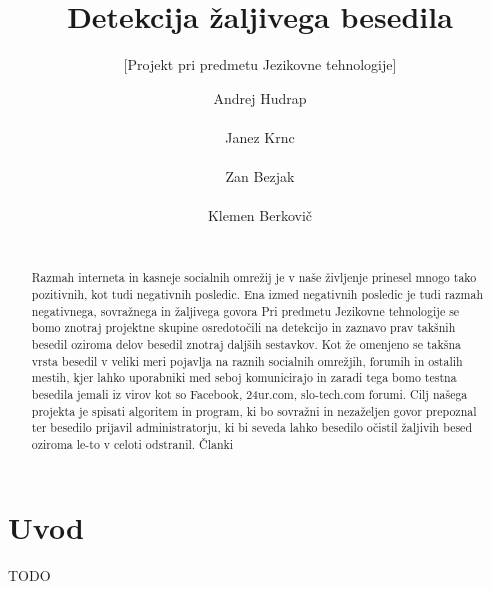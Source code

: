 \documentclass{acm_proc_article-sp}
\begin{document}
\title{Detekcija žaljivega besedila}
\subtitle{[Projekt pri predmetu Jezikovne tehnologije]}


\author{
\alignauthor 
Andrej Hudrap\\
       \\
\alignauthor 
Janez Krnc\\
       \\
\alignauthor 
Zan Bezjak\\
       \\
\alignauthor 
Klemen Berkovič\\
       \\
}

\maketitle

\begin{abstract}
Razmah interneta in kasneje socialnih omrežij je v naše življenje prinesel mnogo tako pozitivnih, kot tudi negativnih posledic.
Ena izmed negativnih posledic je tudi razmah negativnega, sovražnega in žaljivega govora
Pri predmetu Jezikovne tehnologije se bomo znotraj projektne skupine osredotočili na detekcijo in zaznavo prav takšnih besedil oziroma delov besedil znotraj daljših sestavkov.
Kot že omenjeno se takšna vrsta besedil v veliki meri pojavlja na raznih socialnih omrežjih, forumih in ostalih mestih, kjer lahko uporabniki med seboj komunicirajo in zaradi tega bomo testna besedila jemali iz virov kot so Facebook, 24ur.com, slo-tech.com forumi.
Cilj našega projekta je spisati algoritem in program, ki bo sovražni in nezaželjen govor prepoznal ter besedilo prijavil administratorju, ki bi seveda lahko besedilo očistil žaljivih besed oziroma le-to v celoti odstranil.
Članki~\cite{Burnap2016, Chen:2012:DOL:2411131.2411739, POI3:POI385}
\end{abstract}


\section{Uvod}
TODO



 
\end{document}
